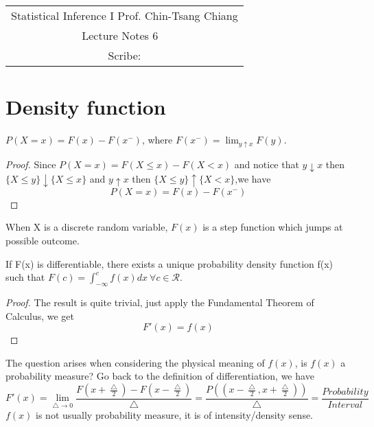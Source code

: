 \documentclass[../Probability_Theory.tex]{subfiles}
\begin{document}
	\begin{center}
		\renewcommand{\arraystretch}{2}
		\begin{bfseries}
			\begin{tabular}{|c|}
				\hline
				Statistical Inference I \hfill Prof. Chin-Tsang Chiang\\
				\hspace{15em} {\large Lecture Notes 6} \hspace{15em}\ \\
				\lecdate \hfill Scribe: \scribe\\
				\hline
			\end{tabular}
			\renewcommand{\arraystretch}{1}
		\end{bfseries}
	\end{center}


\section{Density function}
\begin{theorem}
$P(X=x)=F(x)-F(x^-)$, where $F(x^-)=\lim_{y\uparrow x}F(y).$
\end{theorem}
\begin{proof}
Since $P(X=x)=F(X\leq x)-F(X<x)$ and notice that  $y\downarrow x$ then $\{X\leq y\}\downarrow\{X\leq x\}$ and $y\uparrow x$ then $\{X\leq y\}\uparrow\{X<x \}$,we have $$P(X=x)=F(x)-F(x^-)$$
\end{proof}
When X is a discrete random variable, $F(x)$ is a step function which jumps at possible outcome.
\begin{theorem}
If F(x) is differentiable, there exists a unique probability density function f(x) such that $F(c)=\int_{-\infty}^c f(x)dx\ \forall c\in \mathcal{R}.$  
\end{theorem}
\begin{proof}
The result is quite trivial, just apply the Fundamental Theorem of Calculus, we get $$F'(x)=f(x)$$ 
\end{proof}
The question arises when considering the physical meaning of $f(x)$, is $f(x)$ a probability measure? Go back to the definition of differentiation, we have
$$F'(x)=\lim_{\bigtriangleup\rightarrow 0}\frac{F(x+\frac{\bigtriangleup}{2})-F(x-\frac{\bigtriangleup}{2})}{\bigtriangleup}=\frac{P((x-\frac{\bigtriangleup}{2},x+\frac{\bigtriangleup}{2}))}{\bigtriangleup}=\frac{Probability}{Interval}$$ 
$f(x)$ is not usually probability measure, it is of intensity/density sense.
\end{document}
